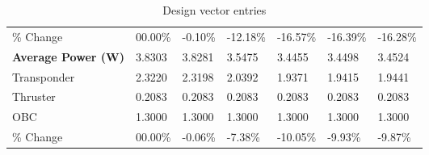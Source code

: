 \begin{table}[H]
\begin{tabular}{lllllll}
\% Change & 00.00\% &-0.10\% & -12.18\% & -16.57\% & -16.39\% & -16.28\% \\
\rowcolor[HTML]{EFEFEF} 
\cellcolor[HTML]{EFEFEF}\textbf{Average Power (W)} & \cellcolor[HTML]{EFEFEF}3.8303 & 3.8281 & 3.5475 & 3.4455 & 3.4498 & 3.4524 \\
Transponder & 2.3220 & 2.3198 & 2.0392 & 1.9371 & 1.9415 & 1.9441 \\
Thruster & 0.2083 & 0.2083 & 0.2083 & 0.2083 & 0.2083 & 0.2083 \\
OBC & 1.3000 & 1.3000 & 1.3000 & 1.3000 & 1.3000 & 1.3000 \\
\% Change & 00.00\% &-0.06\% & -7.38\% & -10.05\% & -9.93\% & -9.87\% \\
\end{tabular}
\caption{Design vector entries}
\label{tab:DesignVectorEntries_default56dur1len3intPropulsion}
\end{table}